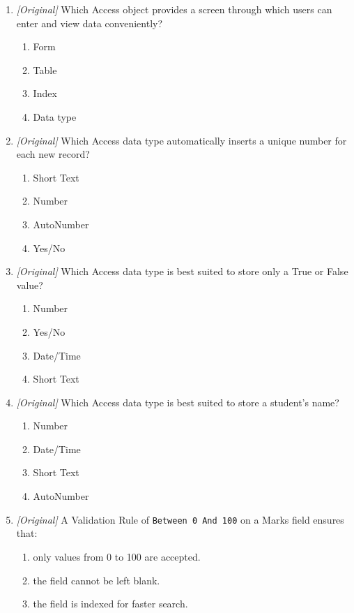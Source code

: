 \documentclass[11pt]{article}
\begin{document}
\begin{enumerate}[label=\textbf{Q\arabic*.}, leftmargin=*]
\begin{enumerate}[label=\Alph*.]
  \end{enumerate}
\item \textit{[Original]} Which Access object provides a screen through which
  users can enter and view data conveniently?
  \begin{enumerate}[label=\Alph*.]
    \item Form
    \item Table
    \item Index
    \item Data type
  \end{enumerate}
\item \textit{[Original]} Which Access data type automatically inserts a
  unique number for each new record?
  \begin{enumerate}[label=\Alph*.]
    \item Short Text
    \item Number
    \item AutoNumber
    \item Yes/No
  \end{enumerate}
\item \textit{[Original]} Which Access data type is best suited to store only
  a True or False value?
  \begin{enumerate}[label=\Alph*.]
    \item Number
    \item Yes/No
    \item Date/Time
    \item Short Text
  \end{enumerate}
\item \textit{[Original]} Which Access data type is best suited to store a
  student's name?
  \begin{enumerate}[label=\Alph*.]
    \item Number
    \item Date/Time
    \item Short Text
    \item AutoNumber
  \end{enumerate}
\item \textit{[Original]} A Validation Rule of \texttt{Between 0 And 100} on a
  Marks field ensures that:
  \begin{enumerate}[label=\Alph*.]
    \item only values from 0 to 100 are accepted.
    \item the field cannot be left blank.
    \item the field is indexed for faster search.

\end{enumerate}
\end{enumerate}
\end{document}
